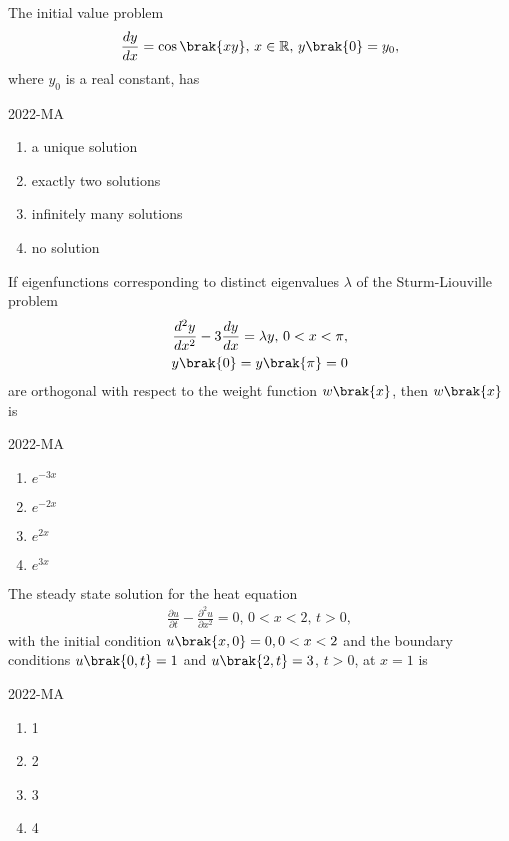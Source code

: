 \item The initial value problem 
	\begin{align*}
		\frac{dy}{dx}= \cos \brak{xy}, \, x \in \mathbb{R}, \, y\brak{0} =y_0,
	\end{align*}
 where $y_0$ is a real constant, has

\hfill{2022-MA}


 	\begin{enumerate}
		\item a unique solution
		\item exactly two solutions
		\item infinitely many solutions
		\item no solution
	\end{enumerate}

\item If eigenfunctions corresponding to distinct eigenvalues $\lambda$ of the Sturm-Liouville problem 
	\begin{align*}
		\frac{d^2 y}{dx^2}-3\frac{dy}{dx}= \lambda y, \, 0<x<\pi, \\
		y\brak{0}=y\brak{\pi}=0
	\end{align*}
are orthogonal with respect to the weight function $w\brak{x}$, then $w\brak{x}$ is

\hfill{2022-MA}

	\begin{enumerate}
		\item $e^{-3x}$
		\item $e^{-2x}$
		\item $e^{2x}$
		\item $e^{3x}$
	\end{enumerate}

\item The steady state solution for the heat equation
	\begin{align*}
		\frac{\partial u}{\partial t}-\frac{\partial^2 u}{\partial x^2}=0, \, 0<x<2, \, t>0,
	\end{align*}
	with the initial condition $u\brak{x,0}=0, 0<x<2$ and the boundary conditions $u\brak{0,t}=1$ and $u\brak{2,t}=3$, $t>0$, at $x=1$ is
	
	\hfill{2022-MA}


	\begin{enumerate}
		\item 1
		\item 2
		\item 3
		\item 4
	\end{enumerate}

